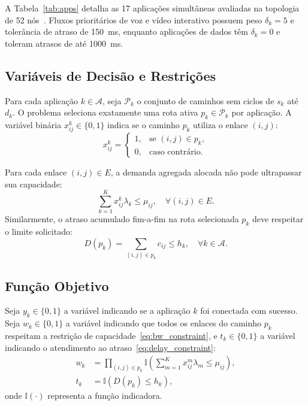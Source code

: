 \documentclass[journal]{IEEEtran}
\begin{document}
A Tabela~\ref{tab:apps} detalha as 17 aplica\c{c}\~{o}es simult\^{a}neas avaliadas na topologia de 52 n\'{o}s~\cite{ladeia2018otimizacao}. Fluxos priorit\'{a}rios de voz e v\'{i}deo interativo possuem peso $\delta_k = 5$ e toler\^{a}ncia de atraso de 150~ms, enquanto aplica\c{c}\~{o}es de dados t\^{e}m $\delta_k = 0$ e toleram atrasos de at\'{e} 1000~ms.

\subsection{Vari\'{a}veis de Decis\~{a}o e Restri\c{c}\~{o}es}
Para cada aplica\c{c}\~{a}o $k \in \mathcal{A}$, seja $\mathcal{P}_k$ o conjunto de caminhos sem ciclos de $s_k$ at\'{e} $d_k$. O problema seleciona exatamente uma rota ativa $p_k \in \mathcal{P}_k$ por aplica\c{c}\~{a}o. A vari\'{a}vel bin\'{a}ria $x_{ij}^k \in \{0, 1\}$ indica se o caminho $p_k$ utiliza o enlace $(i, j)$:
\begin{equation}
x_{ij}^k = \begin{cases} 1, & \text{se } (i, j) \in p_k, \\ 0, & \text{caso contr\'{a}rio.} \end{cases}
\end{equation}

Para cada enlace $(i, j) \in E$, a demanda agregada alocada n\~{a}o pode ultrapassar sua capacidade:
\begin{equation}
\sum_{k=1}^K x_{ij}^k \lambda_k \le \mu_{ij}, \quad \forall (i, j) \in E.
\label{eq:bw_constraint}
\end{equation}
Similarmente, o atraso acumulado fim-a-fim na rota selecionada $p_k$ deve respeitar o limite solicitado:
\begin{equation}
D(p_k) = \sum_{(i,j) \in p_k} c_{ij} \le h_k, \quad \forall k \in \mathcal{A}.
\label{eq:delay_constraint}
\end{equation}

\subsection{Fun\c{c}\~{a}o Objetivo}
Seja $y_k \in \{0, 1\}$ a vari\'{a}vel indicando se a aplica\c{c}\~{a}o $k$ foi conectada com sucesso. Seja $w_k \in \{0, 1\}$ a vari\'{a}vel indicando que todos os enlaces do caminho $p_k$ respeitam a restri\c{c}\~{a}o de capacidade~\eqref{eq:bw_constraint}, e $t_k \in \{0, 1\}$ a vari\'{a}vel indicando o atendimento ao atraso~\eqref{eq:delay_constraint}:
\begin{align}
w_k &= \prod_{(i,j) \in p_k} \mathbb{I}\left( \sum_{m=1}^K x_{ij}^m \lambda_m \le \mu_{ij} \right), \\
t_k &= \mathbb{I}\left( D(p_k) \le h_k \right),
\end{align}
onde $\mathbb{I}(\cdot)$ representa a fun\c{c}\~{a}o indicadora.
\end{document}
